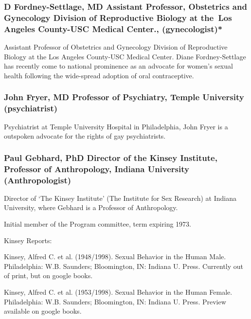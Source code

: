 \subsubsection{D Fordney-Settlage, MD Assistant Professor, Obstetrics and Gynecology Division of Reproductive Biology at the Los Angeles County-USC Medical Center., (gynecologist)*}
\label{dfordney-settlagemdassistantprofessorobstetricsandgynecologydivisionofreproductivebiologyatthe losangelescounty-uscmedicalcenter.gynecologist}

Assistant Professor of Obstetrics and Gynecology Division of Reproductive Biology at the Los Angeles County-USC Medical Center. Diane Fordney-Settlage has recently come to national prominence as an advocate for women's sexual health following the wide-spread adoption of oral contraceptive.

\subsubsection{John Fryer, MD Professor of Psychiatry, Temple University (psychiatrist)}
\label{johnfryermdprofessorofpsychiatrytempleuniversitypsychiatrist}

Psychiatrist at Temple University Hospital in Philadelphia, John Fryer is a outspoken advocate for the rights of gay psychiatrists.

\subsubsection{Paul Gebhard, PhD Director of the Kinsey Institute, Professor of Anthropology, Indiana University (Anthropologist)}
\label{paulgebhardphddirectorofthekinseyinstituteprofessorofanthropologyindianauniversityanthropologist}

Director of `The Kinsey Institute' (The Institute for Sex Research) at Indiana University, where Gebhard is a Professor of Anthropology. 

Initial member of the Program committee, term expiring 1973.

Kinsey Reports:

Kinsey, Alfred C. et al. (1948\slash 1998). Sexual Behavior in the Human Male. Philadelphia: W.B. Saunders; Bloomington, IN: Indiana U. Press. Currently out of print, but on google books.

Kinsey, Alfred C. et al. (1953\slash 1998). Sexual Behavior in the Human Female. Philadelphia: W.B. Saunders; Bloomington, IN: Indiana U. Press. Preview available on google books.

